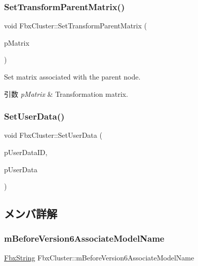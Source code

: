 \subsubsection{\texorpdfstring{Set\+Transform\+Parent\+Matrix()}{SetTransformParentMatrix()}}
{\footnotesize\ttfamily void Fbx\+Cluster\+::\+Set\+Transform\+Parent\+Matrix (\begin{DoxyParamCaption}\item[{const \hyperlink{class_fbx_a_matrix}{Fbx\+A\+Matrix} \&}]{p\+Matrix }\end{DoxyParamCaption})}

Set matrix associated with the parent node. 
\begin{DoxyParams}{引数}
{\em p\+Matrix} & Transformation matrix. \\
\hline
\end{DoxyParams}
\mbox{\label{class_fbx_cluster_a8b2707b5d49a1e3e565884056df011f0}} 
\subsubsection{\texorpdfstring{Set\+User\+Data()}{SetUserData()}}
{\footnotesize\ttfamily void Fbx\+Cluster\+::\+Set\+User\+Data (\begin{DoxyParamCaption}\item[{const char $\ast$}]{p\+User\+Data\+ID,  }\item[{const char $\ast$}]{p\+User\+Data }\end{DoxyParamCaption})}



\subsection{メンバ詳解}
\mbox{\label{class_fbx_cluster_a96b44a5dd28301425c0412b3cf4ea729}} 
\subsubsection{\texorpdfstring{m\+Before\+Version6\+Associate\+Model\+Name}{mBeforeVersion6AssociateModelName}}
{\footnotesize\ttfamily \hyperlink{class_fbx_string}{Fbx\+String} Fbx\+Cluster\+::m\+Before\+Version6\+Associate\+Model\+Name}

